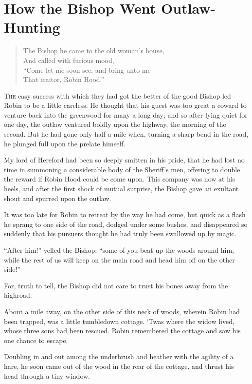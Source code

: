 \chapter{How the Bishop Went Outlaw-Hunting}

\begin{quote}
The Bishop he came to the old woman’s house,\\
And called with furious mood,\\
“Come let me soon see, and bring unto me\\
That traitor, Robin Hood.”
\end{quote}

\lettrine{T}{he} easy success with which they had got the better of the good Bishop
led Robin to be a little careless. He thought that his guest was too
great a coward to venture back into the greenwood for many a long day;
and so after lying quiet for one day, the outlaw ventured boldly upon
the highway, the morning of the second. But he had gone only half a mile
when, turning a sharp bend in the road, he plunged full upon the prelate
himself.

My lord of Hereford had been so deeply smitten in his pride, that he had
lost no time in summoning a considerable body of the Sheriff's men,
offering to double the reward if Robin Hood could be come upon. This
company was now at his heels, and after the first shock of mutual
surprise, the Bishop gave an exultant shout and spurred upon the outlaw.

It was too late for Robin to retreat by the way he had come, but quick
as a flash he sprang to one side of the road, dodged under some bushes,
and disappeared so suddenly that his pursuers thought he had truly been
swallowed up by magic.

``After him!'' yelled the Bishop; ``some of you beat up the woods around
him, while the rest of us will keep on the main road and head him off on
the other side!''

For, truth to tell, the Bishop did not care to trust his bones away from
the highroad.

About a mile away, on the other side of this neck of woods, wherein
Robin had been trapped, was a little tumbledown cottage. `Twas where the
widow lived, whose three sons had been rescued. Robin remembered the
cottage and saw his one chance to escape.

Doubling in and out among the underbrush and heather with the agility of
a hare, he soon came out of the wood in the rear of the cottage, and
thrust his head through a tiny window.

